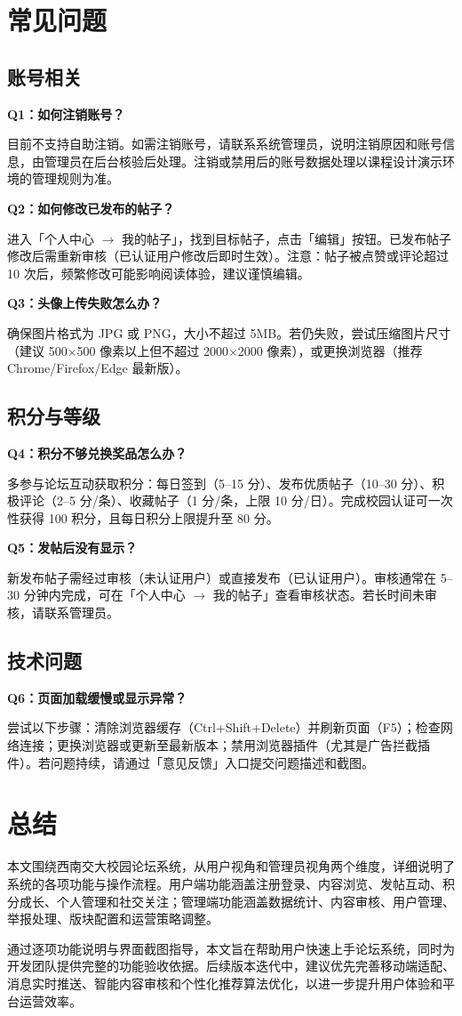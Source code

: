 \documentclass[bwprint]{report}
\begin{document}
\section{常见问题}

\subsection{账号相关}
\textbf{Q1：如何注销账号？}

目前不支持自助注销。如需注销账号，请联系系统管理员，说明注销原因和账号信息，由管理员在后台核验后处理。注销或禁用后的账号数据处理以课程设计演示环境的管理规则为准。

\textbf{Q2：如何修改已发布的帖子？}

进入「个人中心 $\rightarrow$ 我的帖子」，找到目标帖子，点击「编辑」按钮。已发布帖子修改后需重新审核（已认证用户修改后即时生效）。注意：帖子被点赞或评论超过 10 次后，频繁修改可能影响阅读体验，建议谨慎编辑。

\textbf{Q3：头像上传失败怎么办？}

确保图片格式为 JPG 或 PNG，大小不超过 5MB。若仍失败，尝试压缩图片尺寸（建议 500$\times$500 像素以上但不超过 2000$\times$2000 像素），或更换浏览器（推荐 Chrome/Firefox/Edge 最新版）。

\subsection{积分与等级}

\textbf{Q4：积分不够兑换奖品怎么办？}

多参与论坛互动获取积分：每日签到（5--15 分）、发布优质帖子（10--30 分）、积极评论（2--5 分/条）、收藏帖子（1 分/条，上限 10 分/日）。完成校园认证可一次性获得 100 积分，且每日积分上限提升至 80 分。

\textbf{Q5：发帖后没有显示？}

新发布帖子需经过审核（未认证用户）或直接发布（已认证用户）。审核通常在 5--30 分钟内完成，可在「个人中心 $\rightarrow$ 我的帖子」查看审核状态。若长时间未审核，请联系管理员。

\subsection{技术问题}

\textbf{Q6：页面加载缓慢或显示异常？}

尝试以下步骤：清除浏览器缓存（Ctrl+Shift+Delete）并刷新页面（F5）；检查网络连接；更换浏览器或更新至最新版本；禁用浏览器插件（尤其是广告拦截插件）。若问题持续，请通过「意见反馈」入口提交问题描述和截图。



\section{总结}

本文围绕西南交大校园论坛系统，从用户视角和管理员视角两个维度，详细说明了系统的各项功能与操作流程。用户端功能涵盖注册登录、内容浏览、发帖互动、积分成长、个人管理和社交关注；管理端功能涵盖数据统计、内容审核、用户管理、举报处理、版块配置和运营策略调整。

通过逐项功能说明与界面截图指导，本文旨在帮助用户快速上手论坛系统，同时为开发团队提供完整的功能验收依据。后续版本迭代中，建议优先完善移动端适配、消息实时推送、智能内容审核和个性化推荐算法优化，以进一步提升用户体验和平台运营效率。
\end{document}

